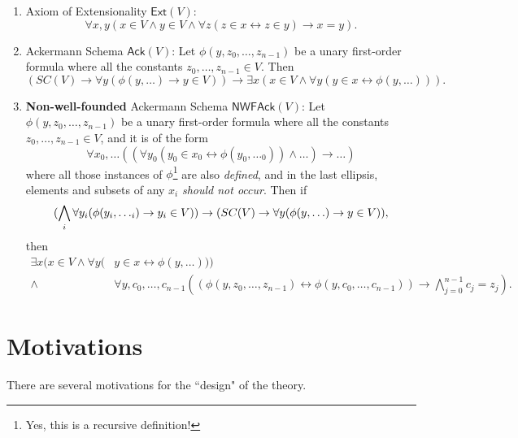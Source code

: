 \documentclass{article}
\begin{document}
\begin{enumerate}
    \item Axiom of Extensionality $\textsf{Ext}(V)$: $$\forall x, y (x \in V \wedge y \in V \wedge \forall z(z\in x \leftrightarrow z \in y) \rightarrow x = y).$$
    \item Ackermann Schema $\textsf{Ack}(V)$: Let $\phi(y, z_0, \ldots, z_{n-1})$ be a unary first-order formula where all the constants $z_0, \ldots, z_{n-1} \in V$. Then $$(SC(V) \rightarrow \forall y(\phi(y, \ldots) \rightarrow y \in V)) \rightarrow \exists x(x \in V \wedge \forall y(y \in x \leftrightarrow \phi(y, \ldots))).$$
    \item \textbf{Non-well-founded} Ackermann Schema $\textsf{NWFAck}(V)$: Let $\phi(y, z_0, \ldots, z_{n-1})$ be a unary first-order formula where all the constants $z_0, \ldots, z_{n-1} \in V$, and it is of the form
$$\forall x_0, \ldots ((\forall y_0(y_0 \in x_0 \leftrightarrow \phi(y_0, \ldots_0)) \wedge \ldots) \rightarrow \ldots)$$
where all those instances of $\phi$\footnote{Yes, this is a recursive definition!} are also \textit{defined}, and in the last ellipsis, elements and subsets of any $x_i$ \textit{should not occur}. Then if
$$(\bigwedge_i \forall y_i( \phi(y_i, \ldots_i) \rightarrow y_i \in V)) \rightarrow \\ (SC(V) \rightarrow \forall y(\phi(y, \ldots) \rightarrow y \in V)),$$
then
\begin{align*}
    \exists x(x \in V \wedge \forall y(&y \in x \leftrightarrow \phi(y, \ldots))) \\ \wedge\ &\forall y, c_0, \ldots, c_{n-1} ((\phi(y, z_0, \ldots, z_{n-1}) \leftrightarrow \phi(y, c_0, \ldots, c_{n-1})) \rightarrow \bigwedge_{j=0}^{n-1} {c_j = z_j}).
\end{align*}
\end{enumerate}

\section{Motivations}
There are several motivations for the ``design" of the theory.\\
\end{document}
